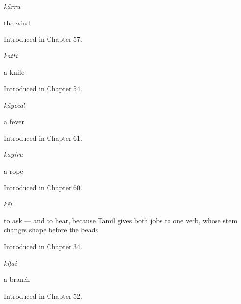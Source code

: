 \noindent\begin{minipage}[t]{\linewidth}
\raggedright
\textbf{}\enspace\emph{kāṟṟu}\par
\small the wind\par
\footnotesize Introduced in Chapter 57.
\end{minipage}\par\medskip

\noindent\begin{minipage}[t]{\linewidth}
\raggedright
\textbf{}\enspace\emph{katti}\par
\small a knife\par
\footnotesize Introduced in Chapter 54.
\end{minipage}\par\medskip

\noindent\begin{minipage}[t]{\linewidth}
\raggedright
\textbf{}\enspace\emph{kāyccal}\par
\small a fever\par
\footnotesize Introduced in Chapter 61.
\end{minipage}\par\medskip

\noindent\begin{minipage}[t]{\linewidth}
\raggedright
\textbf{}\enspace\emph{kayiṟu}\par
\small a rope\par
\footnotesize Introduced in Chapter 60.
\end{minipage}\par\medskip

\noindent\begin{minipage}[t]{\linewidth}
\raggedright
\textbf{}\enspace\emph{kēḷ}\par
\small to ask — and to hear, because Tamil gives both jobs to one verb, whose stem changes shape before the beads\par
\footnotesize Introduced in Chapter 34.
\end{minipage}\par\medskip

\noindent\begin{minipage}[t]{\linewidth}
\raggedright
\textbf{}\enspace\emph{kiḷai}\par
\small a branch\par
\footnotesize Introduced in Chapter 52.
\end{minipage}\par\medskip

